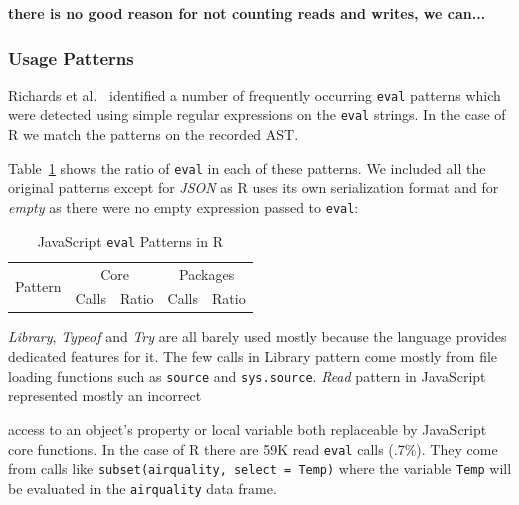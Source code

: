 \documentclass[a4paper,USenglish,cleveref, autoref, thm-restate]{lipics-v2019}
\newcommand{\PatternReadRnd}{59K\xspace}
\newcommand{\PatternReadRatio}{.7\%\xspace}
\newcommand{\eval}{\texttt{eval}\xspace}
\renewcommand{\c}[1]{\lstinline{#1}\xspace}
\begin{document}
{\bf there is no good reason for not counting reads and writes, we can...}





\subsubsection{Usage Patterns}

Richards et al.~\cite{ecoop11} identified a number of frequently occurring \eval
patterns which were detected using simple regular expressions on the \eval
strings. In the case of R we match the patterns on the recorded AST.

Table~\ref{table:js-pattens-in-r} shows the ratio of \eval in each of these
patterns. We included all the original patterns except for \emph{JSON} as R uses
its own serialization format and for \emph{empty} as there were no empty expression
passed to \eval:

\begin{table}[ht]%
  \centering
\begin{tabular}{r|r|r|r|r}\hline
\multirow{2}{*}{Pattern} & \multicolumn{2}{c|}{Core} & \multicolumn{2}{c}{Packages} \\
                         & Calls & Ratio            & Calls & Ratio \\\hline

\end{tabular}
\caption{JavaScript \eval Patterns in R}
\label{table:js-pattens-in-r}
\end{table}


\noindent \emph{Library}, \emph{Typeof} and \emph{Try} are all barely used
mostly because the language provides dedicated features for it. The few calls in
Library pattern come mostly from file loading functions such as \c{source} and
\c{sys.source}.
%
\noindent \emph{Read} pattern in JavaScript represented mostly an incorrect

access to an object's property or local variable both replaceable by
JavaScript core functions. In the case of R there are \PatternReadRnd read
\eval calls (\PatternReadRatio). They come from calls like
\c{subset(airquality, select = Temp)} where the variable \c{Temp} will be
evaluated in the \c{airquality} data frame.
\end{document}
